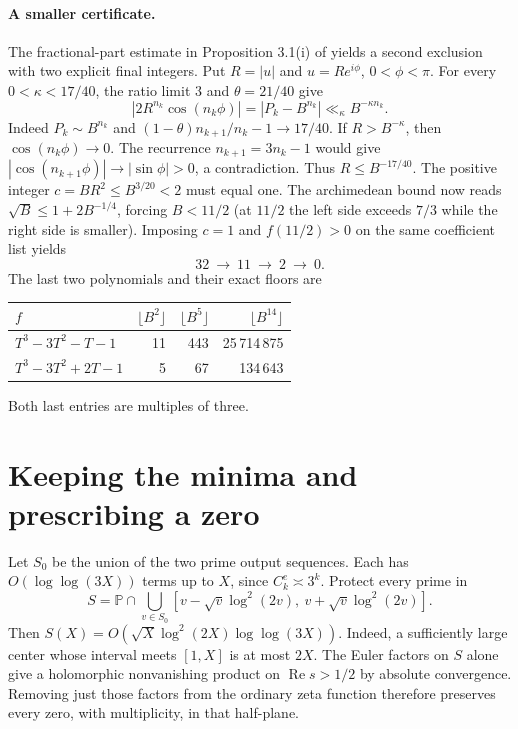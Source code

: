 \documentclass[11pt]{article}
\newcommand{\PP}{\mathbb P}
\newcommand{\floor}[1]{\lfloor #1\rfloor}
\newcommand{\Rea}{\operatorname{Re}}
\begin{document}
\paragraph{A smaller certificate.}
The fractional-part estimate in Proposition 3.1(i) of \cite{saito} yields a second exclusion with two explicit final integers. Put $R=|u|$ and $u=R e^{i\phi}$, $0<\phi<\pi$. For every $0<\kappa<17/40$, the ratio limit $3$ and $\theta=21/40$ give
\[
 |2R^{n_k}\cos(n_k\phi)|=|P_k-B^{n_k}|\ll_\kappa B^{-\kappa n_k}.
\]
Indeed $P_k\sim B^{n_k}$ and $(1-\theta)n_{k+1}/n_k-1\to17/40$. If $R>B^{-\kappa}$, then $\cos(n_k\phi)\to0$. The recurrence $n_{k+1}=3n_k-1$ would give $|\cos(n_{k+1}\phi)|\to|\sin\phi|>0$, a contradiction. Thus $R\le B^{-17/40}$. The positive integer $c=BR^2\le B^{3/20}<2$ must equal one. The archimedean bound now reads $\sqrt B\le1+2B^{-1/4}$, forcing $B<11/2$ (at $11/2$ the left side exceeds $7/3$ while the right side is smaller). Imposing $c=1$ and $f(11/2)>0$ on the same coefficient list yields
\[
 32\ \longrightarrow\ 11\ \longrightarrow\ 2\ \longrightarrow\ 0.
\]
The last two polynomials and their exact floors are
\begin{center}
\begin{tabular}{lrrr}
\toprule
$f$ & $\floor{B^2}$ & $\floor{B^5}$ & $\floor{B^{14}}$\\
\midrule
$T^3-3T^2-T-1$ & 11 & 443 & 25\,714\,875\\
$T^3-3T^2+2T-1$ & 5 & 67 & 134\,643\\
\bottomrule
\end{tabular}
\end{center}
Both last entries are multiples of three.

\section{Keeping the minima and prescribing a zero}
Let $S_0$ be the union of the two prime output sequences. Each has $O(\log\log(3X))$ terms up to $X$, since $C_k^e\asymp3^k$. Protect every prime in
\[
 S=\PP\cap\bigcup_{v\in S_0}[v-\sqrt v\log^2(2v),\ v+\sqrt v\log^2(2v)] .
\]
Then $S(X)=O(\sqrt X\log^2(2X)\log\log(3X))$. Indeed, a sufficiently large center whose interval meets $[1,X]$ is at most $2X$. The Euler factors on $S$ alone give a holomorphic nonvanishing product on $\Rea s>1/2$ by absolute convergence. Removing just those factors from the ordinary zeta function therefore preserves every zero, with multiplicity, in that half-plane.
\end{document}
